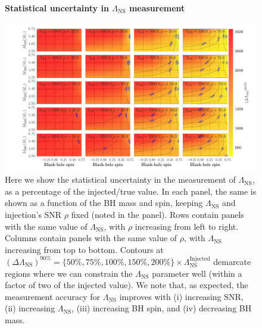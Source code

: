 \documentclass[aps,prd,amsmath,floats,floatfix, twocolumn,
superscriptaddress,nofootinbib,showpacs]{revtex4-1}
\newcommand{\lambdans}{\Lambda_\mathrm{NS}}
\begin{document}
\begin{figure}
\centering    
\textbf{Statistical uncertainty in $\lambdans$ measurement}\par\medskip
\includegraphics[trim={2cm 0 0 0},width=2.2\columnwidth]{plots/TTLambdaRawCIWidths90_0_Lambda_SNR}
\caption{Here we show the statistical uncertainty in the measurement of
$\lambdans$, as a percentage of the injected/true value. In each panel, the
same is shown as a function of the BH mass and spin, keeping $\lambdans$ and
injection's SNR $\rho$ fixed (noted in the panel). Rows contain panels
with the same value of $\lambdans$, with $\rho$ increasing from left to right.
Columns contain panels with the same value of $\rho$, with $\lambdans$ 
increasing from top to bottom.
% 
Contours at $(\Delta\lambdans)^{90\%}=\{50\%, 75\%, 100\%, 150\%, 200\%\}\times\lambdans^\mathrm{Injected}$ demarcate regions where we can constrain the
$\lambdans$ parameter well (within a factor of two of the injected value).
% 
We note that, as expected, the measurement accuracy for $\lambdans$ improves
with (i) increasing SNR, (ii) increasing $\lambdans$, (iii) increasing BH spin,
and (iv) decreasing BH mass.
}
\label{fig:TT_LambdaCIWidths90_0_Lambda_SNR}
\end{figure}
\end{document}

